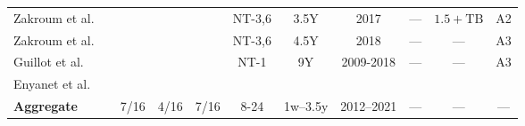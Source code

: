 \documentclass[manuscript,nonacm]{acmart}
\newcommand{\cmark}{\ding{51}}%
\begin{document}
\begin{table*}[h!]
\begin{tabular}{@{}lccccccccc@{}}
        Zakroum et al.\textbf{~\cite{2022zakroum}}~\cite{2018zakroum}
        & ~\cite{2018zakroum}
        & & \cmark
        & NT-3,6
        & 3.5Y & 2017
        & --- & $1.5+\mathrm{TB}$
        & A2 \\

        Zakroum et al.~\cite{2023zakroum}
        & ~\cite{2023zakroum}
        & &
        & NT-3,6
        & 4.5Y & 2018
        & --- & ---
        & A3 \\

        Guillot et al.~\cite{2019guillot} 
        & ~\cite{2013quan}
        & \cmark &
        & NT-1
        & 9Y & 2009-2018
        & --- & ---
        & A3 \\

        Enyanet et al.~\cite{2024enyanet} 
        & 
        & &
        &
        & &
        & &
        & \\

        \midrule
        \textbf{Aggregate}
        & 7/16
        & 4/16 & 7/16
        & 8-24
        & 1w--3.5y & 2012--2021
        & --- & ---
        & --- \\
        \bottomrule
    \end{tabular}
\end{table*}
\end{document}
